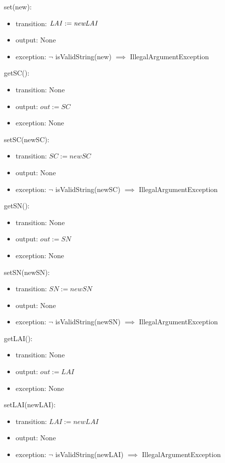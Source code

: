 \documentclass[12pt, titlepage]{article}
\begin{document}
\noindent set\attr(new\attr):
\begin{itemize}
\item transition: $\mathit{\attr := new\attr}$
\item output: None
\item exception: $\neg$ isValidString(new\attr) $\implies$
IllegalArgumentException
\end{itemize}


\renewcommand{\attr}{SC}
\noindent get\attr():
\begin{itemize}
\item transition: None
\item output: $\mathit{out := \attr}$
\item exception: None
\end{itemize}

\noindent set\attr(new\attr):
\begin{itemize}
\item transition: $\mathit{\attr := new\attr}$
\item output: None
\item exception: $\neg$ isValidString(new\attr) $\implies$
IllegalArgumentException
\end{itemize}


\renewcommand{\attr}{SN}
\noindent get\attr():
\begin{itemize}
\item transition: None
\item output: $\mathit{out := \attr}$
\item exception: None
\end{itemize}

\noindent set\attr(new\attr):
\begin{itemize}
\item transition: $\mathit{\attr := new\attr}$
\item output: None
\item exception: $\neg$ isValidString(new\attr) $\implies$
IllegalArgumentException
\end{itemize}


\renewcommand{\attr}{LAI}
\noindent get\attr():
\begin{itemize}
\item transition: None
\item output: $\mathit{out := \attr}$
\item exception: None
\end{itemize}

\noindent set\attr(new\attr):
\begin{itemize}
\item transition: $\mathit{\attr := new\attr}$
\item output: None
\item exception: $\neg$ isValidString(new\attr) $\implies$
IllegalArgumentException
\end{itemize}
\end{document}

